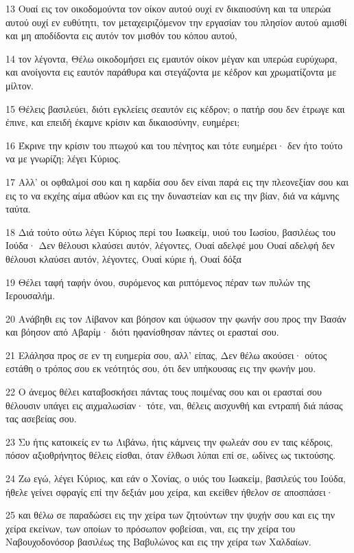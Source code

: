 \par 13 Ουαί εις τον οικοδομούντα τον οίκον αυτού ουχί εν δικαιοσύνη και τα υπερώα αυτού ουχί εν ευθύτητι, τον μεταχειριζόμενον την εργασίαν του πλησίον αυτού αμισθί και μη αποδίδοντα εις αυτόν τον μισθόν του κόπου αυτού,
\par 14 τον λέγοντα, Θέλω οικοδομήσει εις εμαυτόν οίκον μέγαν και υπερώα ευρύχωρα, και ανοίγοντα εις εαυτόν παράθυρα και στεγάζοντα με κέδρον και χρωματίζοντα με μίλτον.
\par 15 Θέλεις βασιλεύει, διότι εγκλείεις σεαυτόν εις κέδρον; ο πατήρ σου δεν έτρωγε και έπινε, και επειδή έκαμνε κρίσιν και δικαιοσύνην, ευημέρει;
\par 16 Έκρινε την κρίσιν του πτωχού και του πένητος και τότε ευημέρει· δεν ήτο τούτο να με γνωρίζη; λέγει Κύριος.
\par 17 Αλλ' οι οφθαλμοί σου και η καρδία σου δεν είναι παρά εις την πλεονεξίαν σου και εις το να εκχέης αίμα αθώον και εις την δυναστείαν και εις την βίαν, διά να κάμνης ταύτα.
\par 18 Διά τούτο ούτω λέγει Κύριος περί του Ιωακείμ, υιού του Ιωσίου, βασιλέως του Ιούδα· Δεν θέλουσι κλαύσει αυτόν, λέγοντες, Ουαί αδελφέ μου Ουαί αδελφή δεν θέλουσι κλαύσει αυτόν, λέγοντες, Ουαί κύριε ή, Ουαί δόξα
\par 19 Θέλει ταφή ταφήν όνου, συρόμενος και ριπτόμενος πέραν των πυλών της Ιερουσαλήμ.
\par 20 Ανάβηθι εις τον Λίβανον και βόησον και ύψωσον την φωνήν σου προς την Βασάν και βόησον από Αβαρίμ· διότι ηφανίσθησαν πάντες οι ερασταί σου.
\par 21 Ελάλησα προς σε εν τη ευημερία σου, αλλ' είπας, Δεν θέλω ακούσει· ούτος εστάθη ο τρόπος σου εκ νεότητός σου, ότι δεν υπήκουσας εις την φωνήν μου.
\par 22 Ο άνεμος θέλει καταβοσκήσει πάντας τους ποιμένας σου και οι ερασταί σου θέλουσιν υπάγει εις αιχμαλωσίαν· τότε, ναι, θέλεις αισχυνθή και εντραπή διά πάσας τας ασεβείας σου.
\par 23 Συ ήτις κατοικείς εν τω Λιβάνω, ήτις κάμνεις την φωλεάν σου εν ταις κέδροις, πόσον αξιοθρήνητος θέλεις είσθαι, όταν έλθωσι λύπαι επί σε, ωδίνες ως τικτούσης.
\par 24 Ζω εγώ, λέγει Κύριος, και εάν ο Χονίας, ο υιός του Ιωακείμ, βασιλεύς του Ιούδα, ήθελε γείνει σφραγίς επί την δεξιάν μου χείρα, και εκείθεν ήθελον σε αποσπάσει·
\par 25 και θέλω σε παραδώσει εις την χείρα των ζητούντων την ψυχήν σου και εις την χείρα εκείνων, των οποίων το πρόσωπον φοβείσαι, ναι, εις την χείρα του Ναβουχοδονόσορ βασιλέως της Βαβυλώνος και εις την χείρα των Χαλδαίων.
